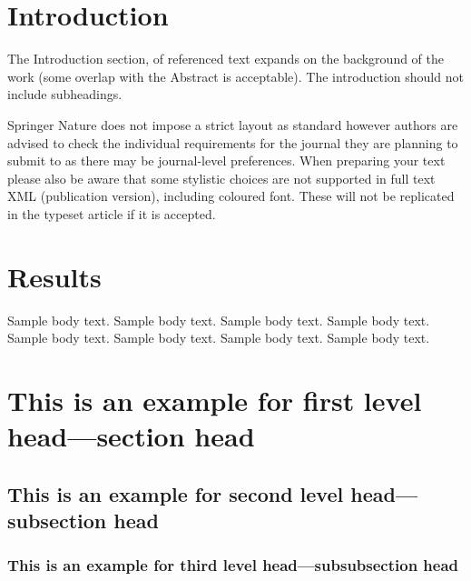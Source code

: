 \documentclass[sn-basic,pdflatex]{sn-jnl}
\theoremstyle{remark}
\theoremstyle{definition}
\begin{document}



\maketitle

\section{Introduction}\label{sec1}

The Introduction section, of referenced text \citet{bib1} expands on the
background of the work (some overlap with the Abstract is acceptable).
The introduction should not include subheadings.

Springer Nature does not impose a strict layout as standard however
authors are advised to check the individual requirements for the journal
they are planning to submit to as there may be journal-level
preferences. When preparing your text please also be aware that some
stylistic choices are not supported in full text XML (publication
version), including coloured font. These will not be replicated in the
typeset article if it is accepted.

\section{Results}\label{sec2}

Sample body text. Sample body text. Sample body text. Sample body text.
Sample body text. Sample body text. Sample body text. Sample body text.

\section{This is an example for first level head---section
head}\label{sec3}

\subsection{This is an example for second level head---subsection
head}\label{subsec2}

\subsubsection{This is an example for third level head---subsubsection
head}\label{subsubsec2}
\end{document}

